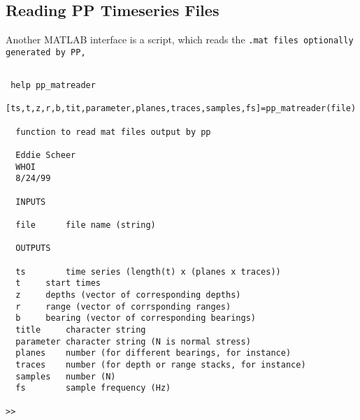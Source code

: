 \subsection{Reading PP Timeseries Files}

Another MATLAB interface is a script, which reads the \tt .mat \rm
files optionally  generated by PP,

\begin{verbatim}

 help pp_matreader
 [ts,t,z,r,b,tit,parameter,planes,traces,samples,fs]=pp_matreader(file)
 
  function to read mat files output by pp
 
  Eddie Scheer
  WHOI
  8/24/99
 
  INPUTS	
 
  file 		file name (string)
 
  OUTPUTS
 
  ts		time series (length(t) x (planes x traces))
  t		start times 
  z		depths (vector of corresponding depths)
  r		range (vector of corrsponding ranges)
  b		bearing (vector of corresponding bearings)
  title		character string
  parameter	character string (N is normal stress)
  planes	number (for different bearings, for instance)
  traces	number (for depth or range stacks, for instance)
  samples	number (N)
  fs		sample frequency (Hz)

>> 
\end{verbatim}
